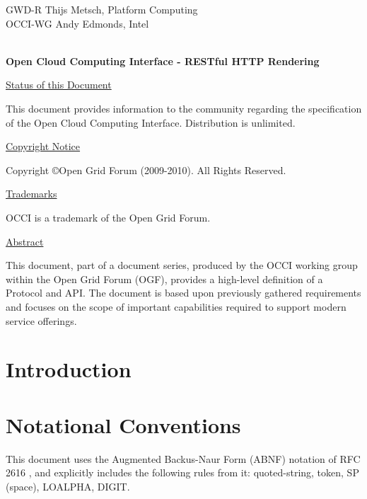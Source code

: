 \documentclass[10pt,a4paper]{article}
\begin{document}
\thispagestyle{empty}

GWD-R \hfill Thijs Metsch, Platform Computing\\
OCCI-WG \hfill Andy Edmonds, Intel\\
\\

\vspace*{0.5in}

\begin{Large}
\textbf{Open Cloud Computing Interface - RESTful HTTP Rendering}
\end{Large}

\vspace*{0.5in}

\underline{Status of this Document}

This document provides information to the community regarding the
specification of the Open Cloud Computing Interface. Distribution is
unlimited.

\underline{Copyright Notice}

Copyright \copyright Open Grid Forum (2009-2010). All Rights Reserved.

\underline{Trademarks}

OCCI is a trademark of the Open Grid Forum.

\underline{Abstract}

This document, part of a document series, produced by the OCCI working
group within the Open Grid Forum (OGF), provides a high-level
definition of a Protocol and API. The document is based upon
previously gathered requirements and focuses on the scope of important
capabilities required to support modern service offerings.

\newpage
\tableofcontents
\newpage

\section{Introduction}


\section{Notational Conventions}


This document uses the Augmented Backus-Naur Form (ABNF) notation of RFC 2616
\cite{rfc2616}, and explicitly includes the following rules from it:
quoted-string, token, SP (space), LOALPHA, DIGIT.
\end{document}
